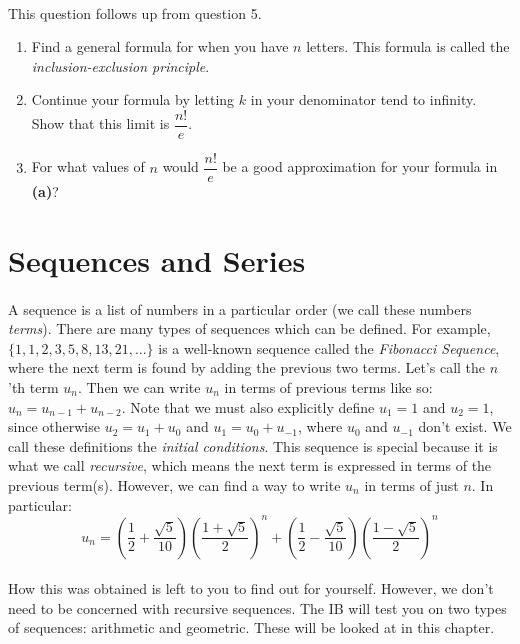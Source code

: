\documentclass[12pt, a4paper, titlepage, twoside]{article}
\begin{document}
	\paragraph{}
	 This question follows up from question 5.
	
	\begin{enumerate}[label=\textbf{(\alph*)}]
		\item Find a general formula for when you have $n$ letters. This formula is called the \textit{inclusion-exclusion principle}.
		\item Continue your formula by letting $k$ in your denominator tend to infinity. Show that this limit is $\dfrac{n!}{e}$.
		\item For what values of $n$ would $\dfrac{n!}{e}$ be a good approximation for your formula in \textbf{(a)}?
	\end{enumerate}
	
	\newpage	
	
	
	
\section{Sequences and Series}

	\paragraph{}
	A sequence is a list of numbers in a particular order (we call these numbers \textit{terms}).
	There are many types of sequences which can be defined. For example, $\{1,1,2,3,5,8,13,21,...\}$ is a well-known sequence
	called the \textit{Fibonacci Sequence}, where the next term is found by adding the previous two terms. Let's call the $n$'th term 
	$u_n$. Then we can write $u_n$ in terms of previous terms like so: $u_n = u_{n-1} + u_{n-2}$. Note that we must also explicitly 
	define $u_1 = 1$ and $u_2 = 1$, since otherwise $u_2 = u_1 + u_0$ and $u_1 = u_0 + u_{-1}$, where $u_0$ and $u_{-1}$ 
	don't exist. We call these definitions the \textit{initial conditions}. This sequence is special because it is what we call \textit{recursive},
	which means the next term is expressed in terms of the previous term(s). However, we can find a way to write $u_n$ in terms of
	just $n$. In particular: $$u_n = \left(\dfrac{1}{2} + \dfrac{\sqrt{5}}{10}\right)\left(\dfrac{1+\sqrt{5}}{2}\right)^n
	+ \left(\dfrac{1}{2} - \dfrac{\sqrt{5}}{10}\right)\left(\dfrac{1-\sqrt{5}}{2}\right)^n$$
	
	\paragraph{}
	How this was obtained is left to you to find out for yourself. However, we don't need to be concerned with recursive sequences.
	The IB will test you on two types of sequences: arithmetic and geometric. These will be looked at in this chapter.
	
\end{document}
